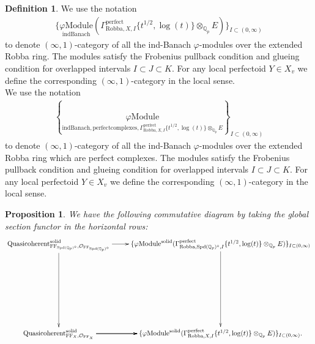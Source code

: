 \documentclass[12pt]{book}
\newtheorem{proposition}{Proposition}
\theoremstyle{definition}
\newtheorem{definition}{Definition}
\begin{document}
\begin{definition}
We use the notation
\begin{align}
\{\underset{\mathrm{indBanach}}{\varphi\mathrm{Module}}(\Gamma^\text{perfect}_{\text{Robba},X,I}\{t^{1/2},\log(t)\}\otimes_{\mathbb{Q}_p}E)\}_{I\subset (0,\infty)}
\end{align}
to denote $(\infty,1)$-category of all the ind-Banach $\varphi$-modules over the extended Robba ring. The modules satisfy the Frobenius pullback condition and glueing condition for overlapped intervals $I\subset J\subset K$. For any local perfectoid $Y\in X_v$ we define the corresponding $(\infty,1)$-category in the local sense.\\
We use the notation
\begin{align}
\left\{\underset{\mathrm{indBanach,perfectcomplexes},\Gamma^\text{perfect}_{\text{Robba},X,I}\{t^{1/2},\log(t)\}\otimes_{\mathbb{Q}_p}E}{\varphi\mathrm{Module}}\right\}_{I\subset (0,\infty)}
\end{align}
to denote $(\infty,1)$-category of all the ind-Banach $\varphi$-modules over the extended Robba ring which are perfect complexes. The modules satisfy the Frobenius pullback condition and glueing condition for overlapped intervals $I\subset J\subset K$. For any local perfectoid $Y\in X_v$ we define the corresponding $(\infty,1)$-category in the local sense. 

\end{definition}


\begin{proposition}
We have the following commutative diagram by taking the global section functor in the horizontal rows:
\[\displayindent=+0in
\xymatrix@R+7pc{
\mathrm{Quasicoherent}^{\mathrm{solid}}_{\mathrm{FF}_{\mathrm{Spd}(\mathbb{Q}_p)^\diamond},\mathcal{O}_{\mathrm{FF}_{\mathrm{Spd}(\mathbb{Q}_p)^\diamond}}} \ar[r] \ar[d] &\{\varphi\mathrm{Module}^{\mathrm{solid}}(\Gamma^\text{perfect}_{\text{Robba},{\mathrm{Spd}(\mathbb{Q}_p)^\diamond},I}\{t^{1/2},\log(t)\}\otimes_{\mathbb{Q}_p}E)\}_{I\subset (0,\infty)} \ar[d]\\
\mathrm{Quasicoherent}^{\mathrm{solid}}_{\mathrm{FF}_X,\mathcal{O}_{\mathrm{FF}_X}}  \ar[r] \ar[r] \ar[r] &\{\varphi\mathrm{Module}^{\mathrm{solid}}(\Gamma^\text{perfect}_{\text{Robba},X,I}\{t^{1/2},\log(t)\}\otimes_{\mathbb{Q}_p}E)\}_{I\subset (0,\infty)}.   
}
\]
\end{proposition}
\end{document}
